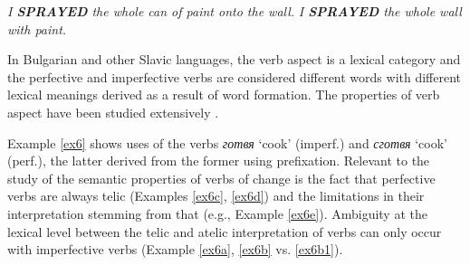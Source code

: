 \documentclass[output=paper,colorlinks,citecolor=brown]{langscibook}
\begin{document}
 \begin{exe}
 \ex \label{ex5}
     \begin{xlist}
         \ex \label{ex5a} \textit{I \textbf{SPRAYED} the whole can of paint onto the wall.}
         \ex \label{ex5b} \textit{I \textbf{SPRAYED} the whole wall with paint.}
     \end{xlist}
\end{exe}

In Bulgarian and other Slavic languages, the verb aspect is a lexical category and the perfective and imperfective verbs are considered different words with different lexical meanings derived as a result of word formation. The properties of verb aspect have been studied extensively \citep{andreychin1944,Ivanchev1971,Nitsolova2008,kutsarov2007,koeva2011,charalozova2021}.

Example \ref{ex6} shows uses of the verbs \textit{готвя} `cook' (imperf.) and \textit{сготвя} `cook' (perf.), the latter derived from the former using prefixation. Relevant to the study of the semantic properties of verbs of change is the fact that perfective verbs are always telic (Examples \ref{ex6c}, \ref{ex6d}) and the limitations in their interpretation stemming from that (e.g., Example \ref{ex6e}). Ambiguity at the lexical level between the telic and atelic interpretation of verbs can only occur with imperfective verbs (Example  \ref{ex6a}, \ref{ex6b} vs. \ref{ex6b1}).
\end{document}
